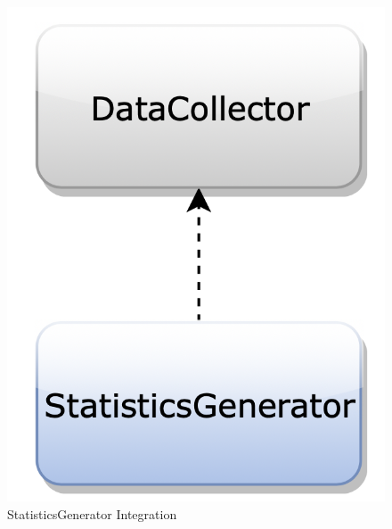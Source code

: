 \begin{figure}[H]
\begin{center}
\begin{minipage}[c]{.40\textwidth}
\includegraphics[scale=0.35]{Images/IntegrationPlanImages/fig6.png}
\caption{StatisticsGenerator Integration}
        \end{minipage}
      \end{center}
\end{figure}

